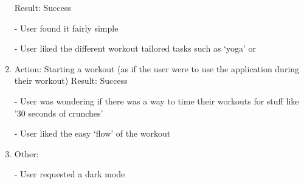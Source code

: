 \documentclass[12pt, titlepage]{article}
\begin{document}
\begin{enumerate}
Result: Success

-	User found it fairly simple

-	User liked the different workout tailored tasks such as ‘yoga’ or 


\item Action: Starting a workout (as if the user were to use the application during their workout)
Result:  Success

-	User was wondering if there was a way to time their workouts for stuff like ’30 seconds of crunches’

-	User liked the easy ‘flow’ of the workout

\item Other: 

- User requested a dark mode

\end{enumerate}
\end{document}
